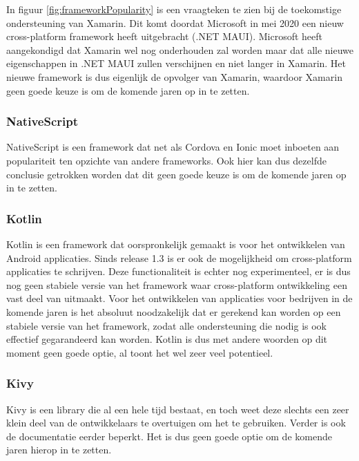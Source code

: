 In figuur \ref{fig:frameworkPopularity} is een vraagteken te zien bij de toekomstige ondersteuning van Xamarin. Dit komt doordat Microsoft in mei 2020 een nieuw cross-platform framework heeft uitgebracht (.NET MAUI). Microsoft heeft aangekondigd dat Xamarin wel nog onderhouden zal worden maar dat alle nieuwe eigenschappen in .NET MAUI zullen verschijnen en niet langer in Xamarin. Het nieuwe framework is dus eigenlijk de opvolger van Xamarin, waardoor Xamarin geen goede keuze is om de komende jaren op in te zetten.

\subsubsection{NativeScript}
\label{subsubsec:NativeScriptEisen}

NativeScript is een framework dat net als Cordova en Ionic moet inboeten aan populariteit ten opzichte van andere frameworks. Ook hier kan dus dezelfde conclusie getrokken worden dat dit geen goede keuze is om de komende jaren op in te zetten.

\subsubsection{Kotlin}
\label{subsubsec:KotlinEisen}

Kotlin is een framework dat oorspronkelijk gemaakt is voor het ontwikkelen van Android applicaties. Sinds release 1.3 is er ook de mogelijkheid om cross-platform applicaties te schrijven. Deze functionaliteit is echter nog experimenteel, er is dus nog geen stabiele versie van het framework waar cross-platform ontwikkeling een vast deel van uitmaakt. Voor het ontwikkelen van applicaties voor bedrijven in de komende jaren is het absoluut noodzakelijk dat er gerekend kan worden op een stabiele versie van het framework, zodat alle ondersteuning die nodig is ook effectief gegarandeerd kan worden. Kotlin is dus met andere woorden op dit moment geen goede optie, al toont het wel zeer veel potentieel.

\subsubsection{Kivy}
\label{subsubsec:KivyEisen}

Kivy is een library die al een hele tijd bestaat, en toch weet deze slechts een zeer klein deel van de ontwikkelaars te overtuigen om het te gebruiken. Verder is ook de documentatie eerder beperkt. Het is dus geen goede optie om de komende jaren hierop in te zetten.

